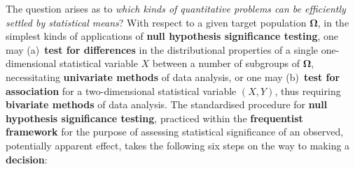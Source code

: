 \medskip
\noindent
The question arises as to \textit{which kinds of quantitative 
problems can be efficiently settled by statistical means}?
With respect to a given target population $\boldsymbol{\Omega}$, 
in the simplest kinds of applications of \textbf{null hypothesis
significance testing}, one may (a)~\textbf{test for differences} in
the distributional properties of a single one-dimensional
statistical variable $X$ between a number of subgroups of
$\boldsymbol{\Omega}$, necessitating \textbf{univariate methods} of
data analysis, or one may (b)~\textbf{test for association} for a
two-dimensional statistical variable $(X,Y)$, thus requiring
\textbf{bivariate methods} of data analysis. The standardised
procedure for \textbf{null hypothesis significance testing},
practiced within the \textbf{frequentist framework} for the purpose
of assessing statistical significance of an observed, potentially
apparent effect, takes the following six steps on the way to making
a \textbf{decision}:

